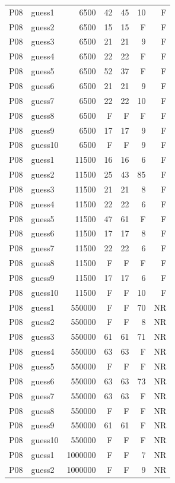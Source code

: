 {\begin{longtable}{llrrrrr}
P08 & guess1 & 6500 & 42 & 45 & 10 & F \\
P08 & guess2 & 6500 & 15 & 15 & F & F \\
P08 & guess3 & 6500 & 21 & 21 & 9 & F \\
P08 & guess4 & 6500 & 22 & 22 & F & F \\
P08 & guess5 & 6500 & 52 & 37 & F & F \\
P08 & guess6 & 6500 & 21 & 21 & 9 & F \\
P08 & guess7 & 6500 & 22 & 22 & 10 & F \\
P08 & guess8 & 6500 & F & F & F & F \\
P08 & guess9 & 6500 & 17 & 17 & 9 & F \\
P08 & guess10 & 6500 & F & F & 9 & F \\
P08 & guess1 & 11500 & 16 & 16 & 6 & F \\
P08 & guess2 & 11500 & 25 & 43 & 85 & F \\
P08 & guess3 & 11500 & 21 & 21 & 8 & F \\
P08 & guess4 & 11500 & 22 & 22 & 6 & F \\
P08 & guess5 & 11500 & 47 & 61 & F & F \\
P08 & guess6 & 11500 & 17 & 17 & 8 & F \\
P08 & guess7 & 11500 & 22 & 22 & 6 & F \\
P08 & guess8 & 11500 & F & F & F & F \\
P08 & guess9 & 11500 & 17 & 17 & 6 & F \\
P08 & guess10 & 11500 & F & F & 10 & F \\
P08 & guess1 & 550000 & F & F & 70 & NR \\
P08 & guess2 & 550000 & F & F & 8 & NR \\
P08 & guess3 & 550000 & 61 & 61 & 71 & NR \\
P08 & guess4 & 550000 & 63 & 63 & F & NR \\
P08 & guess5 & 550000 & F & F & F & NR \\
P08 & guess6 & 550000 & 63 & 63 & 73 & NR \\
P08 & guess7 & 550000 & 63 & 63 & F & NR \\
P08 & guess8 & 550000 & F & F & F & NR \\
P08 & guess9 & 550000 & 61 & 61 & F & NR \\
P08 & guess10 & 550000 & F & F & F & NR \\
P08 & guess1 & 1000000 & F & F & 7 & NR \\
P08 & guess2 & 1000000 & F & F & 9 & NR \\

\end{longtable}}
